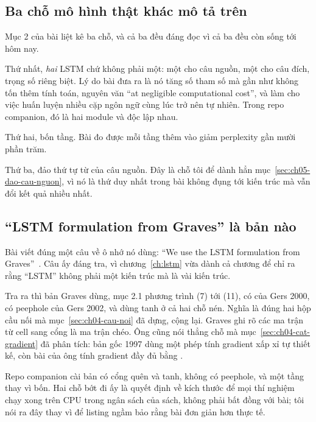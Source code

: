 \subsection*{Ba chỗ mô hình thật khác mô tả trên}

Mục 2 của bài liệt kê ba chỗ, và cả ba đều đáng đọc vì cả ba đều còn sống tới
hôm nay.

Thứ nhất, \emph{hai} LSTM chứ không phải một: một cho câu nguồn, một cho câu
đích, trọng số riêng biệt. Lý do bài đưa ra là nó tăng số tham số mà gần như
không tốn thêm tính toán, nguyên văn \enquote{at negligible computational
cost}, và làm cho việc huấn luyện nhiều cặp ngôn ngữ cùng lúc trở nên tự nhiên.
Trong repo companion, đó là hai module  và  độc lập
nhau.

Thứ hai, bốn tầng. Bài đo được mỗi tầng thêm vào giảm perplexity gần mười phần
trăm.

Thứ ba, đảo thứ tự từ của câu nguồn. Đây là chỗ tôi để dành hẳn
mục~\ref{sec:ch05-dao-cau-nguon}, vì nó là thứ duy nhất trong bài không đụng
tới kiến trúc mà vẫn đổi kết quả nhiều nhất.

\subsection*{\enquote{LSTM formulation from Graves} là bản nào}

%
Bài viết đúng một câu về ô nhớ nó dùng: \enquote{We use the LSTM formulation
from Graves}~\autocite{graves2013generating}. Câu ấy đáng tra, vì
chương~\ref{ch:lstm} vừa dành cả chương để chỉ ra rằng \enquote{LSTM} không
phải một kiến trúc mà là vài kiến trúc.

Tra ra thì bản Graves dùng, mục 2.1 phương trình (7) tới (11), có
 của Gers 2000, có peephole của Gers 2002, và dùng
tanh ở cả hai chỗ nén. Nghĩa là đúng hai hộp cầu nối mà mục~\ref{sec:ch04-cau-noi}
đã dựng, cộng lại. Graves ghi rõ các ma trận từ cell sang cổng là ma trận chéo.
Ông cũng nói thẳng chỗ mà mục~\ref{sec:ch04-cat-gradient} đã phân tích: bản gốc 1997
dùng một phép tính gradient xấp xỉ tự thiết kế, còn bài của ông tính gradient
đầy đủ bằng .

Repo companion cài bản có cổng quên và tanh, không có peephole, và một tầng
thay vì bốn. Hai chỗ bớt đi ấy là quyết định về kích thước để mọi thí nghiệm
chạy xong trên CPU trong ngân sách của sách, không phải bất đồng với bài; tôi
nói ra đây thay vì để listing ngầm bảo rằng bài đơn giản hơn thực tế.

